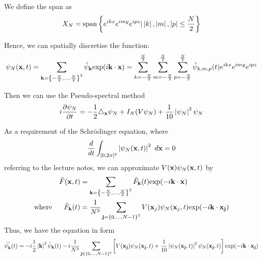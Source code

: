 \documentclass[a4paper,8pt]{article}
\begin{document}
We define the span as
\begin{equation}
X_N = \text{span}\left\{e^{ikx}e^{imy}e^{ipz} | \left\lvert k\right\rvert, \left\lvert m\right\rvert, \left\lvert p\right\rvert \leq \frac{N}{2}\right\} \nonumber
\end{equation}

Hence, we can spatially discretise the function:
\begin{equation}
\psi_N(\bold{x}, t) = \sum\limits_{\bold{k} = \left\{-\frac{N}{2}, \ldots, \frac{N}{2} \right\}^3} \hat{\psi}_{\bold{k}} \text{exp}(i \bold{k} \cdot \bold{x}) = \sum\limits_{k = -\frac{N}{2}}^{\frac{N}{2}} \sum\limits_{m = -\frac{N}{2}}^{\frac{N}{2}} \sum\limits_{p = -\frac{N}{2}}^{\frac{N}{2}} \hat{\psi}_{k,m,p} (t) e^{ikx}e^{imy}e^{ipz} \nonumber
\end{equation}

Then we can use the Pseudo-spectral method
\begin{equation}
i \frac{\partial \psi_N}{\partial t} = -\frac{1}{2} \triangle_{\bold{x}} \psi_N + I_N (V \psi_N) + \frac{1}{10} \left\lvert\psi_N\right\rvert^2 \psi_N \nonumber
\end{equation}

As a requirement of the Schrödinger equation, where
\begin{equation}
\frac{d}{dt} \int_{[0, 2\pi]^3} \left\lvert\psi_N (\bold{x}, t)\right\rvert^2 \ d \bold{x} = 0 \nonumber
\end{equation}
referring to the lecture notes, we can approximate $V(\bold{x}) \psi_N(\bold{x}, t)$ by
\begin{align}
\tilde{F}(\bold{x}, t) &= \sum\limits_{\bold{k} = \left\{-\frac{N}{2}, \ldots, \frac{N}{2} \right\}^3} \tilde{F}_{\bold{k}}(t) \text{exp} (-i \bold{k} \cdot \bold{x}) \nonumber \\
\text{where \ \ \ \ } \tilde{F}_{\bold{k}} (t) &= \frac{1}{N^3} \sum\limits_{\bold{j} = \left\{0, \ldots, N-1 \right\}^3} V (\bold{x}_j) \psi_N (\bold{x}_j, t) \text{exp}(-i\bold{k} \cdot \bold{x}_{\bold{j}} ) \nonumber
\end{align}
Thus, we have the equation in form
\begin{equation}
\hat{\psi}^{'}_{\bold{k}} (t) = -i \frac{1}{2} \left\lvert\bold{k}\right\rvert^2 \hat{\psi}_{\bold{k}} (t) - i \frac{1}{N^3} \sum\limits_{\bold{j} \in \{0, \ldots, N-1\}^3} \left[V(\bold{x}_{\bold{j}}) \psi_N(\bold{x}_{\bold{j}}, t) + \frac{1}{10} \left\lvert\psi_N(\bold{x}_{\bold{j}}, t)\right\rvert^2 \psi_N(\bold{x}_{\bold{j}}, t) \right] \text{exp} (-i \bold{k} \cdot \bold{x}_{\bold{j}}) \nonumber
\end{equation}
\end{document}

